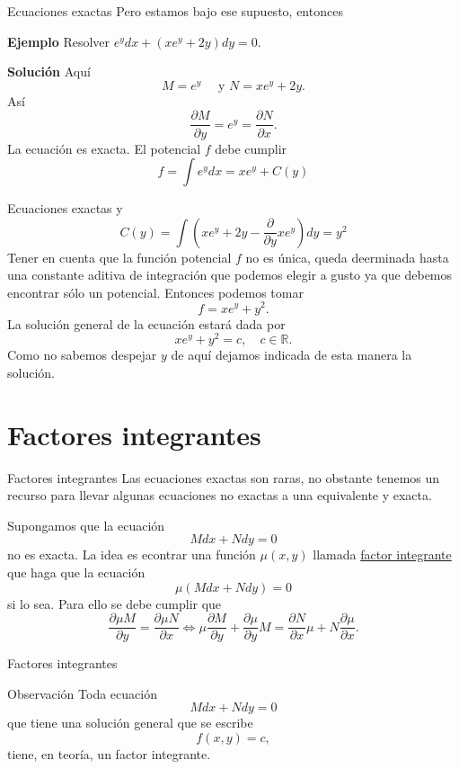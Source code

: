 \documentclass[handout,hyperref={colorlinks=true}]{beamer}
\newcommand{\rr}{\mathbb{R}}
\newcommand{\der}[2]{\frac{\partial #1}{\partial #2}}
\newcommand{\nl}{\onslide<+-> }
\begin{document}
\begin{frame}{Ecuaciones exactas}
\nl Pero estamos bajo ese supuesto, entonces

\nl\textbf{Ejemplo} Resolver $e^ydx+(xe^y+2y)dy=0$. 

\nl\textbf{Solución} Aquí
\[M=e^y\quad\text{ y }N=xe^y+2y.\]
Así
\[\der{M}{y}=e^y=\der{N}{x}.\]
La ecuación es exacta. El potencial $f$ debe cumplir
\[f=\int e^ydx=xe^y+C(y)\]


\end{frame}


\begin{frame}{Ecuaciones exactas}
y
\[C(y)=\int\left( xe^y+2y -\frac{\partial}{\partial y} xe^y\right)dy= y^2\]
Tener en cuenta que la función potencial $f$ no es única, queda deerminada hasta una constante aditiva de integración que podemos elegir a gusto ya que 
debemos encontrar sólo un potencial. Entonces podemos tomar
\[f= xe^y+y^2.\]
La solución general de la ecuación estará dada por
\[xe^y+y^2=c,\quad c\in\rr.\]
Como no sabemos despejar $\boxed{y}$ de aquí dejamos indicada de esta manera la solución.

\end{frame}

\section{Factores integrantes}
\begin{frame}{Factores integrantes}
\nl Las ecuaciones exactas son raras, no obstante tenemos un recurso para llevar algunas ecuaciones no exactas a una equivalente y exacta.

\nl Supongamos que la ecuación
\[Mdx+Ndy=0\]
no es  exacta. La idea es econtrar una función $\mu(x,y)$ llamada 
\href{http://es.wikipedia.org/wiki/Ecuación_diferencial_exacta\#Factor_integrante.}{factor integrante} que haga que la ecuación
\[\mu\left(Mdx+Ndy\right)=0\]
si lo sea. Para ello se debe cumplir que
\begin{equation}\label{carac_factor}
  \der{\mu M}{y}=\der{\mu N}{x}\Longleftrightarrow \boxed{ \mu\der{M}{y}+\der{\mu}{y}M=\der{N}{x}\mu+N\der{\mu}{x}}.
\end{equation}
 
\end{frame}
 
 
\begin{frame}{Factores integrantes}
 \begin{block}{Observación}
  Toda ecuación
  \begin{equation}\label{ec_no_exa}Mdx+Ndy=0
   \end{equation}
  que tiene una solución general que se escribe
  \begin{equation}\label{sol_ec_no_exa}
   f(x,y)=c,  
  \end{equation}
  tiene, en teoría, un factor integrante. 
 \end{block}

 
 
 
\end{frame}
\end{document}

